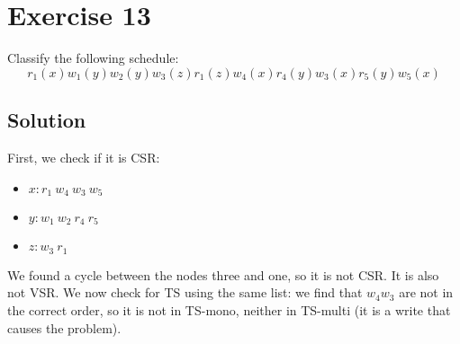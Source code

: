 \section{Exercise 13}

Classify the following schedule:
\[r_1(x) w_1(y) w_2(y) w_3(z) r_1(z) w_4(x) r_4(y) w_3(x) r_5(y) w_5(x)\] 

\subsection*{Solution}
First, we check if it is CSR:
\begin{itemize}
    \item $x: r_1 \: w_4 \: w_3 \: w_5$
    \item $y: w_1 \: w_2 \: r_4 \: r_5$
    \item $z: w_3 \: r_1$
\end{itemize}
We found a cycle between the nodes three and one, so it is not CSR. 
It is also not VSR. We now check for TS using the same list: we find that $w_4 w_3$ are not in the correct order, so it is not in TS-mono, neither in TS-multi (it is a write that causes the problem).